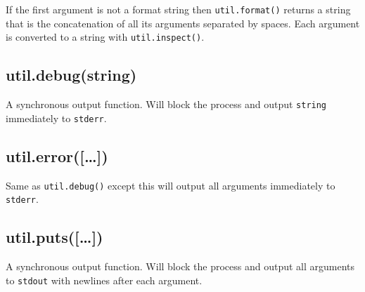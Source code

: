 \begin{Shaded}
\end{Shaded}

If the first argument is not a format string then \texttt{util.format()}
returns a string that is the concatenation of all its arguments
separated by spaces. Each argument is converted to a string with
\texttt{util.inspect()}.

\begin{Shaded}
\begin{Highlighting}[]
\NormalTok{(}\NormalTok{, }\NormalTok{, }\NormalTok{); }
\end{Highlighting}
\end{Shaded}

\subsection{util.debug(string)}

A synchronous output function. Will block the process and output
\texttt{string} immediately to \texttt{stderr}.

\begin{Shaded}
\begin{Highlighting}[]
\NormalTok{(}\NormalTok{);}
\end{Highlighting}
\end{Shaded}

\subsection{util.error({[}\ldots{}{]})}

Same as \texttt{util.debug()} except this will output all arguments
immediately to \texttt{stderr}.

\subsection{util.puts({[}\ldots{}{]})}

A synchronous output function. Will block the process and output all
arguments to \texttt{stdout} with newlines after each argument.

